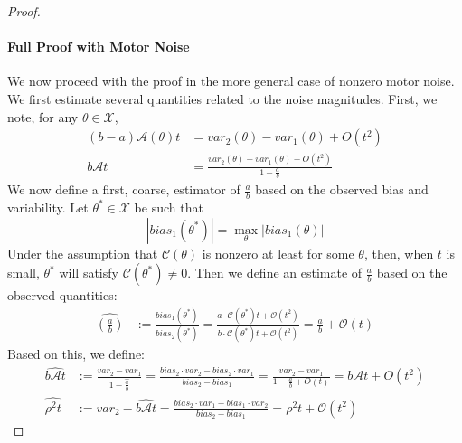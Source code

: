 \begin{proof}
\paragraph*{Full Proof with Motor Noise}
    We now proceed with the proof in the more general case of nonzero motor noise.
    We first estimate several quantities related to the noise magnitudes.
    First, we note, for any $\theta \in \mathcal{X}$,
    \begin{align*}
        (b-a)\mathcal{A}(\theta)t &= var_2(\theta) - var_1(\theta) + O(t^2)\\
        b\mathcal{A}t &= \frac{var_2(\theta) - var_1(\theta) + O(t^2)}{1 -  \frac{a}{b}}
        \end{align*}
        We now define a first, coarse, estimator of $\frac{a}{b}$ based on the observed bias and variability.
        Let $\theta^* \in \mathcal{X}$ be such that
        \begin{equation}
            |bias_1(\theta^*)| = \max_\theta |bias_1(\theta)|
        \end{equation}
        Under the assumption that $\mathcal{C}(\theta)$ is nonzero at least for some $\theta$, then, when $t$ is small, $\theta^*$ will satisfy $\mathcal{C}(\theta^*) \neq 0$.
        Then we define an estimate of $\frac{a}{b}$ based on the observed quantities:
        \begin{align*}
        \widehat{(\frac{a}{b})} &:= \frac{bias_1(\theta^*)}{bias_2(\theta^*)} = \frac{a\cdot \mathcal{C}(\theta^*)t + \mathcal{O}(t^2)}{b\cdot \mathcal{C}(\theta^*)t + \mathcal{O}(t^2)} = \frac{a}{b} + \mathcal{O}(t)
        \end{align*}
        Based on this, we define: 
        \begin{align*}
        \widehat{b\mathcal{A}t} &:= \frac{var_2 - var_1}{1 - \hat{\frac{a}{b}}} = \frac{bias_2 \cdot var_2 - bias_2 \cdot var_1}{bias_2 - bias_1}=\frac{var_2 - var_1}{1 - \frac{a}{b} + O(t)} = b\mathcal{A}t + O(t^2)\\
        \widehat{\rho^2t} &:= var_2 - \widehat{b\mathcal{A}t} = \frac{bias_2 \cdot var_1 - bias_1 \cdot var_2}{bias_2 - bias_1}= \rho^2t + \mathcal{O}(t^2) 
    \end{align*}

\end{proof}
